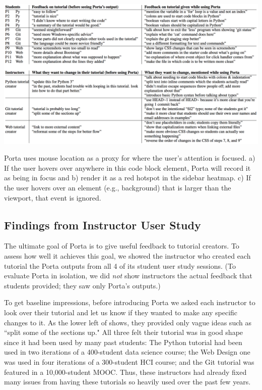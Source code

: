 \begin{table}[h!]
  \label{tab:study-feedback}
  \includegraphics[width=\linewidth]{figures/porta/tbl_feedback.png}
  \caption{Porta uses mouse location as a proxy for where the user's
    attention is focused. a) If the user hovers over anywhere in this code
    block element, Porta will record it as being in focus and b) render it
    as a red hotspot in the sidebar heatmap. c) If the user hovers over an
    element (e.g., background) that is larger than the viewport, that event
    is ignored.}
\end{table}

\subsection{Findings from Instructor User Study}

The ultimate goal of Porta is to give useful feedback to tutorial
creators. To assess how well it achieves this goal, we showed the
instructor who created each tutorial the Porta outputs from all 4 of its
student user study sessions. (To evaluate Porta in isolation, we did
\emph{not} show instructors the actual feedback that students provided;
they saw only Porta's outputs.)


To get baseline impressions, before introducing Porta we asked each
instructor to look over their tutorial and let us know if they wanted to
make any specific changes to it. As the lower left of
 shows, they provided only vague ideas such as
``split some of the sections up." All three felt their tutorial was in
good shape since it had been used by many past students: The Python
tutorial had been used in two iterations of a 400-student data science
course; the Web Design one was used in four iterations of a 300-student
HCI course; and the Git tutorial was featured in a 10,000-student
MOOC. Thus, these instructors had already fixed many issues
from having these tutorials so heavily used over the past few years.

